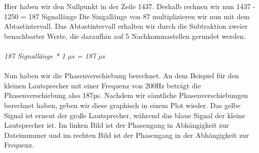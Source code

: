 \documentclass[12pt, oneside, a4paper, \docLanguage]{report}
\begin{document}
\newpage
Hier haben wir den Nullpunkt in der Zeile 1437. Deshalb rechnen wir nun 1437 - 1250 = 187 Signallänge
\newline 
Die Singallänge von 87 multiplizieren wir nun mit dem Abtastintervall. 
Das Abtastintervall erhalten wir durch die Subtraktion zweier benachbarter Werte, die daraufhin auf 5 Nachkommastellen gerundet werden.
\\~\\
\textit{187 Signallänge *  1 µs  = 187 µs} 
\\~\\
Nun haben wir die Phasenverschiebung berechnet. An dem Beispiel für den kleinen Lautsprecher mit einer Frequenz von 200Hz beträgt die Phasenverschiebung also 187µs.
\newline 
Nachdem wir sämtliche Phasenverschiebungen berechnet haben, geben wir diese graphisch in einem Plot wieder.
\newline 
Das gelbe Signal ist erneut der große Lautsprecher, während das blaue Signal der kleine Lautsprecher ist.
Im linken Bild ist der Phasengang in Abhängigkeit zur Dateinummer und im rechten Bild ist der Phasengang in der Abhängigkeit zur Frequenz.
\end{document}
